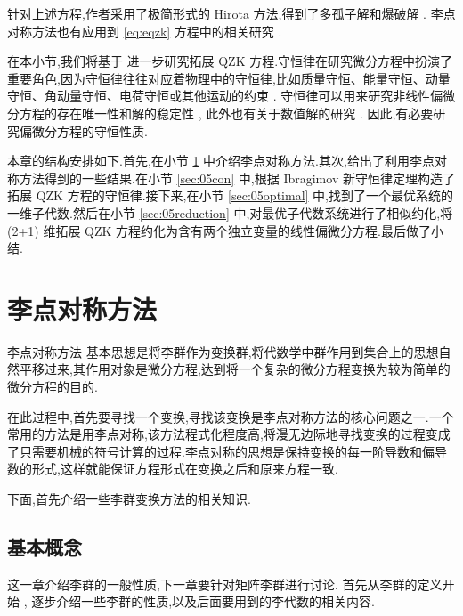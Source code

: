 针对上述方程,作者采用了极简形式的 Hirota 方法,得到了多孤子解和爆破解 \cite{biswas2013soli,bluman2010appli}. 李点对称方法也有应用到 \eqref{eq:eqzk} 方程中的相关研究 \cite{sjoberg2007dou}.

在本小节,我们将基于 \cite{wang2014soli} 进一步研究拓展 QZK 方程.守恒律在研究微分方程中扮演了重要角色,因为守恒律往往对应着物理中的守恒律,比如质量守恒、能量守恒、动量守恒、角动量守恒、电荷守恒或其他运动的约束 \cite{mushtaq2005non,song2013top,song2013dom}. 守恒律可以用来研究非线性偏微分方程的存在唯一性和解的稳定性 \cite{wang2014soli}, 此外也有关于数值解的研究 \cite{wazwaz2005exact,wazwaz2008the}. 因此,有必要研究偏微分方程的守恒性质.

本章的结构安排如下.首先,在小节 \ref{sec:05lie} 中介绍李点对称方法.其次,给出了利用李点对称方法得到的一些结果.在小节 \ref{sec:05con} 中,根据 Ibragimov 新守恒律定理构造了拓展 QZK 方程的守恒律.接下来,在小节 \ref{sec:05optimal} 中,找到了一个最优系统的一维子代数.然后在小节 \ref{sec:05reduction} 中,对最优子代数系统进行了相似约化,将 (2+1) 维拓展 QZK 方程约化为含有两个独立变量的线性偏微分方程.最后做了小结.

\section{李点对称方法}\label{sec:05lie}
李点对称方法 \cite{peter2000sym,bluman2008symmetry} 基本思想是将李群作为变换群,将代数学中群作用到集合上的思想自然平移过来,其作用对象是微分方程,达到将一个复杂的微分方程变换为较为简单的微分方程的目的.

在此过程中,首先要寻找一个变换,寻找该变换是李点对称方法的核心问题之一.一个常用的方法是用李点对称,该方法程式化程度高,将漫无边际地寻找变换的过程变成了只需要机械的符号计算的过程.李点对称的思想是保持变换的每一阶导数和偏导数的形式,这样就能保证方程形式在变换之后和原来方程一致.

下面,首先介绍一些李群变换方法的相关知识.

\subsection{基本概念}
这一章介绍李群的一般性质,下一章要针对矩阵李群进行讨论.
首先从李群的定义开始 \cite{kirillov2008anintro}, 逐步介绍一些李群的性质,以及后面要用到的李代数的相关内容.


